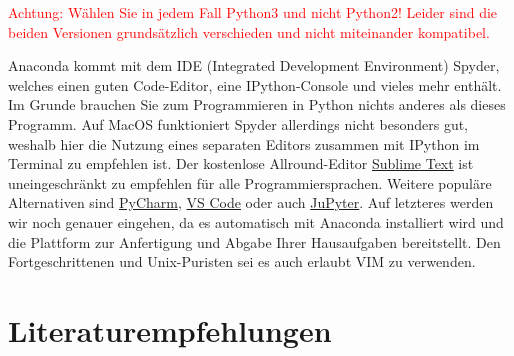 \textcolor{red}{Achtung: W\"ahlen Sie in jedem Fall Python3 und nicht Python2! Leider sind die beiden Versionen grunds\"atzlich verschieden und nicht miteinander kompatibel.}

Anaconda kommt mit dem IDE (Integrated Development Environment) Spyder, welches einen guten Code-Editor, eine IPython-Console und vieles mehr enth\"alt. 
Im Grunde brauchen Sie zum Programmieren in Python nichts anderes als dieses Programm.
Auf MacOS funktioniert Spyder allerdings nicht besonders gut, weshalb hier die Nutzung eines separaten Editors zusammen mit IPython im Terminal zu empfehlen ist. 
Der kostenlose Allround-Editor \href{https://www.sublimetext.com/download}{Sublime Text} ist uneingeschr\"ankt zu empfehlen f\"ur alle Programmiersprachen.
Weitere popul\"are Alternativen sind \href{https://www.jetbrains.com/de-de/pycharm/download/}{PyCharm}, \href{https://code.visualstudio.com}{VS Code} oder auch \href{https://jupyter.org}{JuPyter}. 
Auf letzteres werden wir noch genauer eingehen, da es automatisch mit Anaconda installiert wird und die Plattform zur Anfertigung und Abgabe Ihrer Hausaufgaben bereitstellt.
Den Fortgeschrittenen und Unix-Puristen sei es auch erlaubt VIM zu verwenden.



\section{Literaturempfehlungen}

